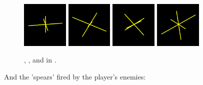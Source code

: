 \begin{figure}[H]
  \centering
        \includegraphics[width=2.22cm]{src/recreation/DSHTBL.png}%
        \hspace{0.2cm}
        \includegraphics[width=2.22cm]{src/recreation/DS2TBL.png}%
        \hspace{0.2cm}
        \includegraphics[width=2.22cm]{src/recreation/DS3TBL.png}%
        \hspace{0.2cm}
        \includegraphics[width=2.22cm]{src/recreation/DS4TBL.png}%
        \hspace{0.2cm}
  \caption*{, ,  and  in .}
\end{figure}
And the 'spears' fired by the player's enemies:

